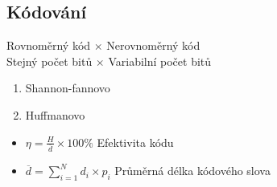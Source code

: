 \documentclass{article}
\begin{document}
\subsection{Kódování}
Rovnoměrný kód $\times$ Nerovnoměrný kód \\
Stejný počet bitů $\times$ Variabilní počet bitů
\begin{enumerate}
    \item Shannon-fannovo
    \item Huffmanovo
\end{enumerate}

\begin{itemize}
    \item $\eta=\frac{H}{\overline{d}}\times 100\%$ Efektivita kódu
    \item $\overline{d}=\sum_{i=1}^{N}d_i\times p_i$ Průměrná délka kódového slova
\end{itemize}
\end{document}
